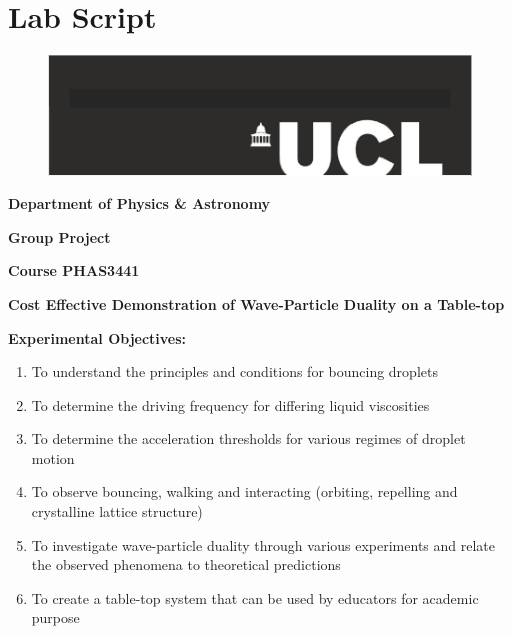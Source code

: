 \section{Lab Script}
\setcounter{equation}{0}
\setcounter{figure}{0}

\begin{figure}[h]
    \centering
    \includegraphics[width=\textwidth]{prototype/UCLlogo.png}
\end{figure}
\bigskip

\begin{center}
\textbf{{\Large Department of Physics \& Astronomy}}

\textbf{{\Large Group Project}}

\textbf{{\Large Course PHAS3441}}

\end{center}
\bigskip

\begin{center}
\noindent\textbf{{\LARGE Cost Effective Demonstration of Wave-Particle Duality on a Table-top}}
\end{center}
\bigskip

\noindent \textbf{Experimental Objectives:}

\begin{enumerate}
\item To understand the principles and conditions for bouncing droplets

\item To determine the driving frequency for differing liquid viscosities

\item To determine the acceleration thresholds for various regimes of droplet motion

\item To observe bouncing, walking and interacting (orbiting, repelling and crystalline lattice structure)

\item To investigate wave-particle duality through various experiments and relate the observed phenomena to theoretical predictions

\item To create a table-top system that can be used by educators for academic purpose
\end{enumerate}
\clearpage
